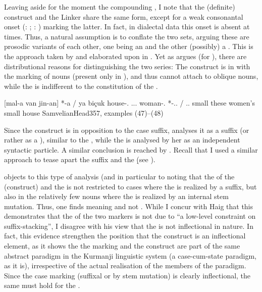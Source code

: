 Leaving aside for the moment the compounding \ez*, I note that the (definite) construct \ez* and the Linker \ez* share the same form, except for a weak consonantal onset (\Kur: ; \Sor: ) marking the latter. In fact, in dialectal data this onset is absent at times. Thus, a natural assumption is to conflate the two sets, arguing these are prosodic variants of each other, one being an  and the other (possibly) a . This is the approach taken by \citet[77]{HaigAlignment} and elaborated upon in \citet{HaigLinker}. Yet  as \citet{SamvelianHead} argues (for \Kur), there are distributional reasons for distinguishing the two series: The construct \ez* is in  with the  marking of nouns (present only in \Kur), and thus cannot attach to oblique nouns, while the \lnk* \ez*  is indifferent to the constitution of the \prim.

{[mal-a van jin-an] *-a / ya biçuk}
{house-\ez.\fem{} \dem.\near.\obl.\pl{} woman-\obl.\pl{} *-\ez..\fem{} / \lnk.\ez.\fem{} small}
{these women’s small house}
{SamvelianHead}{357, examples (47)--(48)}

\largerpage
Since the construct \ez* is in opposition to the \obl* case suffix, \citet[358]{SamvelianHead} analyses it as a suffix (or rather as a ), similar to the \Per \ez*, while the \lnk* \ez* is analysed by her as an independent syntactic particle. A similar conclusion is reached by \citet[53]{SchroederAttribution}.
Recall that I used a similar approach to tease apart the  \cst* suffix \ed and the  \lnk* \d (see ). 

\citet[79]{Haig2004} objects to this type of analysis (and in particular  to \cite{SchroederAttribution} noting that the  of the (construct) \ez* and the  is not restricted to cases where the  is realized by a suffix, but also in the relatively few nouns where the  is realized by an internal stem mutation. Thus, one finds  meaning  and not . While I concur with Haig that this demonstrates that the  of the two markers is not due to \enquote{a low-level constraint on suffix-stacking}, I disagree with his view that the \ez* is not inflectional in nature. In fact, this evidence strengthen the position that the construct \ez* is an inflectional element, as it shows the the  marking and the construct \ez* are part of the same abstract paradigm in the Kurmanji linguistic system (a case-cum-state paradigm, as it is), irrespective of the actual realisation of the members of the paradigm. Since the case marking (suffixal or by stem mutation) is clearly inflectional, the same must hold for the \ez*.  

